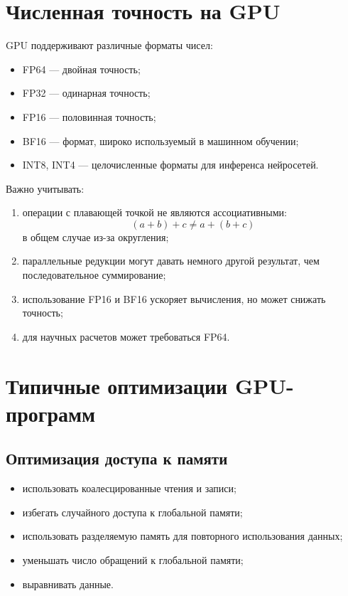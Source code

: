 \documentclass[12pt,a4paper]{article}
\begin{document}
\section{Численная точность на GPU}

GPU поддерживают различные форматы чисел:

\begin{itemize}
    \item FP64 --- двойная точность;
    \item FP32 --- одинарная точность;
    \item FP16 --- половинная точность;
    \item BF16 --- формат, широко используемый в машинном обучении;
    \item INT8, INT4 --- целочисленные форматы для инференса нейросетей.
\end{itemize}

Важно учитывать:

\begin{enumerate}
    \item операции с плавающей точкой не являются ассоциативными:
    \[
        (a+b)+c \ne a+(b+c)
    \]
    в общем случае из-за округления;
    \item параллельные редукции могут давать немного другой результат, чем последовательное суммирование;
    \item использование FP16 и BF16 ускоряет вычисления, но может снижать точность;
    \item для научных расчетов может требоваться FP64.
\end{enumerate}

\section{Типичные оптимизации GPU-программ}

\subsection{Оптимизация доступа к памяти}

\begin{itemize}
    \item использовать коалесцированные чтения и записи;
    \item избегать случайного доступа к глобальной памяти;
    \item использовать разделяемую память для повторного использования данных;
    \item уменьшать число обращений к глобальной памяти;
    \item выравнивать данные.
\end{itemize}
\end{document}
